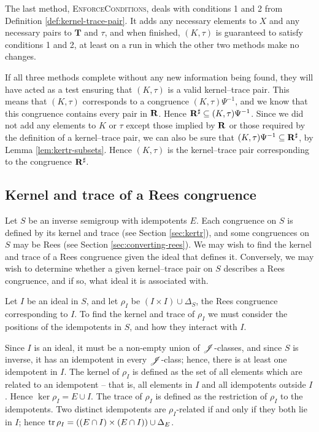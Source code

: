 The last method, \textsc{EnforceConditions}, deals with conditions 1 and 2 from
Definition \ref{def:kernel-trace-pair}.  It adds any necessary elements to $X$
and any necessary pairs to $\mathbf{T}$ and $\tau$, and when finished,
$(K,\tau)$ is guaranteed to satisfy conditions 1 and 2, at least on a run in
which the other two methods make no changes.

If all three methods complete without any new information being found, they will
have acted as a test ensuring that $(K, \tau)$ is a valid kernel--trace pair.
This means that $(K, \tau)$ corresponds to a congruence $(K,\tau)\Psi^{-1}$, and
we know that this congruence contains every pair in $\mathbf{R}$.  Hence
$\mathbf{R}^\sharp \subseteq (K,\tau)\Psi^{-1}$.  Since we did not add any
elements to $K$ or $\tau$ except those implied by $\mathbf{R}$ or those required
by the definition of a kernel--trace pair, we can also be sure that
$(K, \tau)\Psi^{-1} \subseteq \mathbf{R}^\sharp$, by Lemma
\ref{lem:kertr-subsets}.  Hence $(K, \tau)$ is the kernel--trace pair
corresponding to the congruence $\mathbf{R}^\sharp$.

\subsection{Kernel and trace of a Rees congruence}
\label{sec:rees-to-kertr}
Let $S$ be an inverse semigroup with idempotents $E$.  Each congruence on $S$ is
defined by its kernel and trace (see Section \ref{sec:kertr}), and some
congruences on $S$ may be Rees (see Section \ref{sec:converting-rees}).  We may wish
to find the kernel and trace of a Rees congruence given the ideal that defines
it.  Conversely, we may wish to determine whether a given kernel--trace pair on
$S$ describes a Rees congruence, and if so, what ideal it is associated with.

Let $I$ be an ideal in $S$, and let $\rho_I$ be $(I \times I) \cup \Delta_S$,
the Rees congruence corresponding to $I$.  To find the kernel and trace of
$\rho_I$ we must consider the positions of the idempotents in $S$, and how they
interact with $I$.

Since $I$ is an ideal, it must be a non-empty union of $\mathrel{\mathscr{J}}$-classes, and since $S$ is
inverse, it has an idempotent in every $\mathrel{\mathscr{J}}$-class; hence, there is at least one
idempotent in $I$.  The kernel of $\rho_I$ is defined as the set of all elements
which are related to an idempotent -- that is, all elements in $I$ and all
idempotents outside $I$.  Hence $\ker \rho_I = E \cup I$.  The trace of $\rho_I$
is defined as the restriction of $\rho_I$ to the idempotents.  Two distinct
idempotents are $\rho_I$-related if and only if they both lie in $I$; hence
$\operatorname{tr} \rho_I = \left((E \cap I) \times (E \cap I)\right) \cup \Delta_E$.

